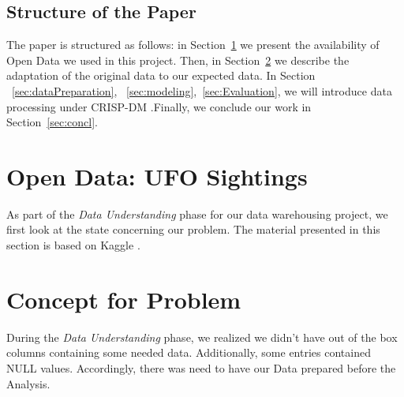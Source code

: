 \documentclass[11pt, journal]{IEEEtran}
\begin{document}
\subsection{Structure of the Paper} \label{subsec:struct}
The paper is structured as follows: in Section~\ref{sec:dataunderstanding} we present the availability of Open Data we used in this project.
Then, in Section~\ref{sec:concept} we describe the adaptation of the original data to our expected data. In Section ~\ref{sec:dataPreparation}, ~\ref{sec:modeling},~\ref{sec:Evaluation}, we will introduce data processing under CRISP-DM \cite{dawaSlide}.Finally, we conclude our work in Section~\ref{sec:concl}.


\section{Open Data: UFO Sightings} \label{sec:dataunderstanding}
As part of the \emph{Data Understanding} phase for our data warehousing project, we first look at the state concerning our problem. The material presented in this section is based on Kaggle \cite{kaggle}.

\section{Concept for Problem} \label{sec:concept}
During the \emph{Data Understanding} phase, we realized we didn't have out of the box columns containing some needed data. Additionally, some entries contained NULL values. Accordingly, there was need to have our Data prepared before the Analysis.
\end{document}
